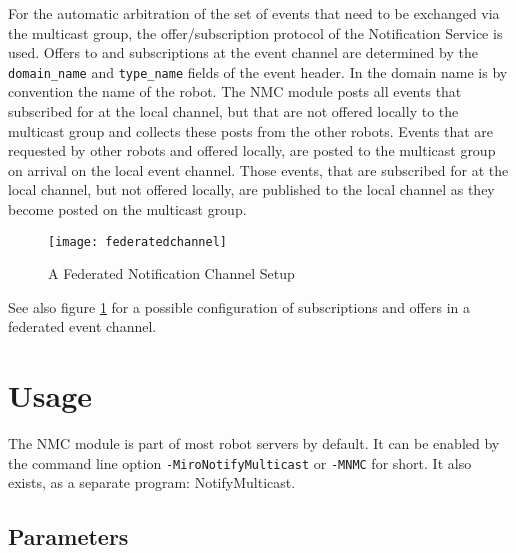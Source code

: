 For the automatic arbitration of the set of events that need to be
exchanged via the multicast group, the offer/subscription protocol of
the Notification Service is used. Offers to and subscriptions at the
event channel are determined by the \texttt{domain\_name} and
\texttt{type\_name} fields of the event header. In \miro the domain
name is by convention the name of the robot. The NMC module
posts all events that subscribed for at the local channel, but that
are not offered locally to the multicast group and collects these
posts from the other robots. Events that are requested by other
robots and offered locally, are posted to the multicast group on arrival
on the local event channel. Those events, that are subscribed for at
the local channel, but not offered locally, are published to the local
channel as they become posted on the multicast group.

\begin{figure}
\begin{center}
\texttt{[image: federatedchannel]}
\caption{\label{fig:federated_channel}
A Federated Notification Channel Setup}
\end{center}

\end{figure}

See also figure \ref{fig:federated_channel} for a possible
configuration of subscriptions and offers in a federated event channel.

\section{Usage}

The NMC module is part of most robot servers by default. It can be
enabled by the command line option \texttt{-MiroNotifyMulticast} or
\texttt{-MNMC} for short. It also exists, as a separate program:
NotifyMulticast.

\subsection{Parameters}

